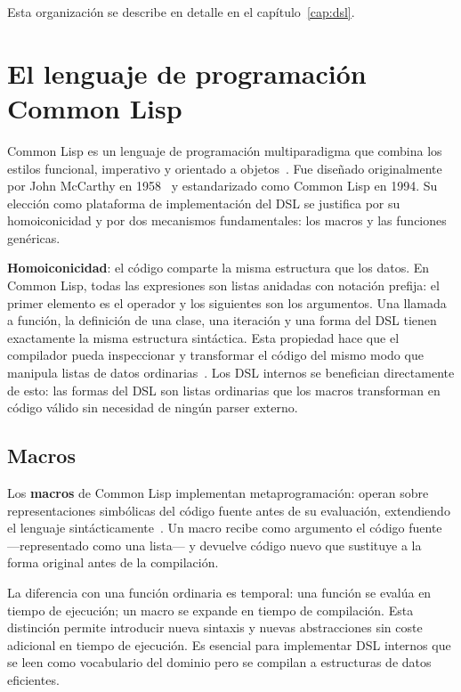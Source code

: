 Esta organización se describe en detalle en el capítulo~\ref{cap:dsl}.

\section{El lenguaje de programaci\'on Common Lisp}
\label{sec:lisp}

Common Lisp es un lenguaje de programación multiparadigma que combina los
estilos funcional, imperativo y orientado a objetos~\cite{steele1990}.  Fue
diseñado originalmente por John McCarthy en 1958~\cite{mccarthy1960} y
estandarizado como Common Lisp en 1994.  Su elección como plataforma de
implementación del DSL se justifica por su homoiconicidad y por dos
mecanismos fundamentales: los macros y las funciones genéricas.

\textbf{Homoiconicidad}: el código comparte la misma estructura que los
datos.  En Common Lisp, todas las expresiones son listas anidadas con
notación prefija: el primer elemento es el operador y los siguientes son
los argumentos.  Una llamada a función, la definición de una clase, una
iteración y una forma del DSL tienen exactamente la misma estructura
sintáctica.  Esta propiedad hace que el compilador pueda inspeccionar y
transformar el código del mismo modo que manipula listas de datos
ordinarias~\cite{graham1993}.  Los DSL internos se benefician directamente
de esto: las formas del DSL son listas ordinarias que los macros transforman
en código válido sin necesidad de ningún parser externo.

\subsection{Macros}
\label{ssec:macros}

Los \textbf{macros} de Common Lisp implementan metaprogramación: operan
sobre representaciones simbólicas del código fuente antes de su evaluación,
extendiendo el lenguaje sintácticamente~\cite{seibel2005}.  Un macro recibe
como argumento el código fuente ---representado como una lista--- y devuelve
código nuevo que sustituye a la forma original antes de la compilación.

La diferencia con una función ordinaria es temporal: una función se evalúa
en tiempo de ejecución; un macro se expande en tiempo de compilación.  Esta
distinción permite introducir nueva sintaxis y nuevas abstracciones sin coste
adicional en tiempo de ejecución.  Es esencial para implementar DSL internos
que se leen como vocabulario del dominio pero se compilan a estructuras de
datos eficientes.

